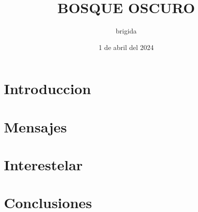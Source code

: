 \documentclass[12pt a4paper]{article}
\title{BOSQUE OSCURO}
\author{brigida}
\date{1 de abril del 2024}
\begin{document}
\maketitle
\section{Introduccion}
\lipsum[2-4]
\section{Mensajes}
\lipsum[2-4]
\section{Interestelar}
\lipsum[2-4]
\section{Conclusiones}
\lipsum[2-4]
\end{document}
